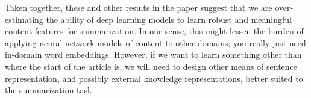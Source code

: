 
%
%


Taken together, these and other results in the paper suggest that we are 
over-estimating the ability of deep learning models to learn robust and 
meaningful content features for summarization.  
In one sense, this might lessen the burden of applying neural network models
of  content to other domains; you really just need in-domain word embeddings.
However, if we want to learn something other than where the start of 
the article is, we will need to design other means of sentence representation,
and possibly external knowledge representations, better suited to the summarization task.







